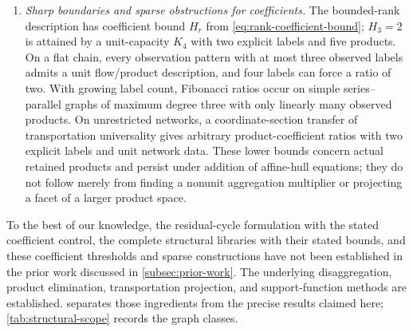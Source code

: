 \begin{enumerate}[leftmargin=*,itemsep=5pt]
\item \emph{Sharp boundaries and sparse obstructions for coefficients.}
The bounded-rank description has coefficient bound $H_r$ from
\eqref{eq:rank-coefficient-bound}; $H_3=2$ is attained by a unit-capacity
$K_4$ with two explicit labels and five products.
On a flat chain, every observation pattern with at most three observed
labels admits a unit flow/product description, and four labels can force
a ratio of two. With growing label count, Fibonacci ratios occur on simple
series--parallel graphs of maximum degree three with only linearly many
observed products. On unrestricted networks, a coordinate-section transfer
of transportation universality gives arbitrary product-coefficient ratios
with two explicit labels and unit network data. These lower bounds concern
actual retained products and persist under addition of affine-hull
equations; they do not follow merely from finding a nonunit aggregation
multiplier or projecting a facet of a larger product space.
\end{enumerate}

To the best of our knowledge, the residual-cycle formulation with the stated
coefficient control, the complete structural libraries with their stated
bounds, and these coefficient thresholds and sparse constructions have not
been established in the prior work discussed in
\cref{subsec:prior-work}. The underlying disaggregation, product elimination,
transportation projection, and support-function methods are established.
 separates those ingredients from the precise
results claimed here; \cref{tab:structural-scope} records the graph classes.

